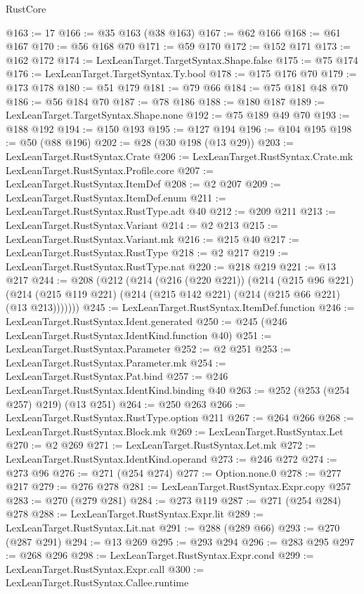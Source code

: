\begin{lexlean}{RustCore}
\begin{coremodule}
@163 := 17
@166 := @35 @163 (@38 @163)
@167 := @62 @166
@168 := @61 @167
@170 := @56 @168 @70
@171 := @59 @170
@172 := @152 @171
@173 := @162 @172
@174 := LexLeanTarget.TargetSyntax.Shape.false
@175 := @75 @174
@176 := LexLeanTarget.TargetSyntax.Ty.bool
@178 := @175 @176 @70
@179 := @173 @178
@180 := @51 @179
@181 := @79 @66
@184 := @75 @181 @48 @70
@186 := @56 @184 @70
@187 := @78 @186
@188 := @180 @187
@189 := LexLeanTarget.TargetSyntax.Shape.none
@192 := @75 @189 @49 @70
@193 := @188 @192
@194 := @150 @193
@195 := @127 @194
@196 := @104 @195
@198 := @50 (@88 @196)
@202 := @28 (@30 @198 (@13 @29))
@203 := LexLeanTarget.RustSyntax.Crate
@206 := LexLeanTarget.RustSyntax.Crate.mk LexLeanTarget.RustSyntax.Profile.core
@207 := LexLeanTarget.RustSyntax.ItemDef
@208 := @2 @207
@209 := LexLeanTarget.RustSyntax.ItemDef.enum
@211 := LexLeanTarget.RustSyntax.RustType.adt @40
@212 := @209 @211
@213 := LexLeanTarget.RustSyntax.Variant
@214 := @2 @213
@215 := LexLeanTarget.RustSyntax.Variant.mk
@216 := @215 @40
@217 := LexLeanTarget.RustSyntax.RustType
@218 := @2 @217
@219 := LexLeanTarget.RustSyntax.RustType.nat
@220 := @218 @219
@221 := @13 @217
@244 := @208
    (@212
      (@214
        (@216 (@220 @221))
        (@214
          (@215 @96 @221)
          (@214 (@215 @119 @221) (@214 (@215 @142 @221) (@214 (@215 @66 @221) (@13 @213)))))))
@245 := LexLeanTarget.RustSyntax.ItemDef.function
@246 := LexLeanTarget.RustSyntax.Ident.generated
@250 := @245 (@246 LexLeanTarget.RustSyntax.IdentKind.function @40)
@251 := LexLeanTarget.RustSyntax.Parameter
@252 := @2 @251
@253 := LexLeanTarget.RustSyntax.Parameter.mk
@254 := LexLeanTarget.RustSyntax.Pat.bind
@257 := @246 LexLeanTarget.RustSyntax.IdentKind.binding @40
@263 := @252 (@253 (@254 @257) @219) (@13 @251)
@264 := @250 @263
@266 := LexLeanTarget.RustSyntax.RustType.option @211
@267 := @264 @266
@268 := LexLeanTarget.RustSyntax.Block.mk
@269 := LexLeanTarget.RustSyntax.Let
@270 := @2 @269
@271 := LexLeanTarget.RustSyntax.Let.mk
@272 := LexLeanTarget.RustSyntax.IdentKind.operand
@273 := @246 @272
@274 := @273 @96
@276 := @271 (@254 @274)
@277 := Option.none.{0}
@278 := @277 @217
@279 := @276 @278
@281 := LexLeanTarget.RustSyntax.Expr.copy @257
@283 := @270 (@279 @281)
@284 := @273 @119
@287 := @271 (@254 @284) @278
@288 := LexLeanTarget.RustSyntax.Expr.lit
@289 := LexLeanTarget.RustSyntax.Lit.nat
@291 := @288 (@289 @66)
@293 := @270 (@287 @291)
@294 := @13 @269
@295 := @293 @294
@296 := @283 @295
@297 := @268 @296
@298 := LexLeanTarget.RustSyntax.Expr.cond
@299 := LexLeanTarget.RustSyntax.Expr.call
@300 := LexLeanTarget.RustSyntax.Callee.runtime

\end{coremodule}
\end{lexlean}
